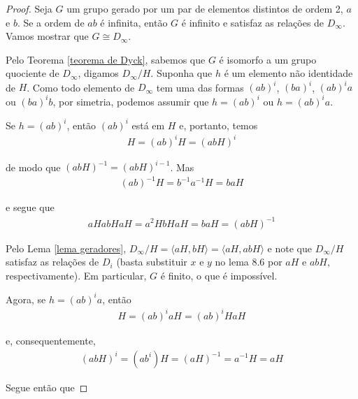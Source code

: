 \documentclass[a4paper,portuguese,11pt,twoside, leqno]{book}
\theoremstyle{definition}
\begin{document}
	\begin{proof}
		Seja $G$ um grupo gerado por um par de elementos distintos de ordem 2, $a$ e $b$. Se a ordem de $ab$ é infinita, então $G$ é infinito e satisfaz as relações de $D_{\infty}$. Vamos mostrar que $G\cong D_{\infty}$. 
		
		\par\vspace{0.3cm} Pelo Teorema \eqref{teorema de Dyck}, sabemos que $G$ é isomorfo a um grupo quociente de $D_{\infty}$, digamos $D_{\infty}/H$. Suponha que $h$ é um elemento não identidade de $H$. Como todo elemento de $D_{\infty}$ tem uma das formas $(ab)^i$, $(ba)^i$, $(ab)^ia$ ou $(ba)^ib$, por simetria, podemos assumir que $h = (ab)^i$ ou $h = (ab)^ia$.
		
		\par\vspace{0.3cm} Se $h = (ab)^i$, então $(ab)^i$ está em $H$ e, portanto, temos
		\begin{align*}
		H = (ab)^iH = (abH)^i
		\end{align*}
		\par\vspace{0.3cm} de modo que $(abH)^{-1} = (abH)^{i-1}$. Mas
		\begin{align*}
		(ab)^{-1}H = b^{-1}a^{-1}H = baH
		\end{align*}
		\par\vspace{0.3cm} e segue que
		\begin{align*}
		aHabHaH = a^2HbHaH = baH = (abH)^{-1}
		\end{align*}
		\par\vspace{0.3cm} Pelo Lema \eqref{lema geradores}, $D_{\infty}/H = \langle aH, bH \rangle = \langle aH, abH \rangle$ e note que $D_{\infty}/H$ satisfaz as relações de $D_i$ (basta substituir $x$ e $y$ no lema 8.6 por $aH$ e $abH$, respectivamente). Em particular, $G$ é finito, o que é impossível.
		\par\vspace{0.3cm} Agora, se $h = (ab)^ia$, então
		\begin{align*}
		H = (ab)^iaH = (ab)^iHaH
		\end{align*}
		\par\vspace{0.3cm} e, consequentemente, 
		\begin{align*}
		(abH)^i = (ab^i)H = (aH)^{-1} = a^{-1}H = aH
		\end{align*}
		\par\vspace{0.3cm} Segue então que

\end{proof}
\end{document}
